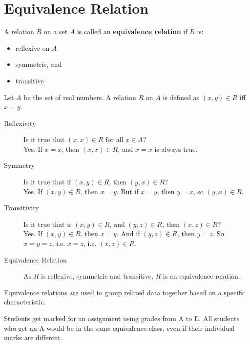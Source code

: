 \documentclass[../notes.tex]{subfiles}
\begin{document}
		\section{Equivalence Relation}
			A relation $R$ on a set $A$ is called an \textbf{equivalence relation} if $R$ is:
			\begin{itemize}[nosep]
				\item reflexive on $A$
				\item symmetric, and
				\item transitive
			\end{itemize}
			\begin{example}
				Let $A$ be the set of real numbers. A relation $R$ on $A$ is defined as $(x, y) \in R$ iff $x = y$.
				\begin{description}
					\item[Reflexivity] Is it true that $(x, x) \in R$ for all $x \in A$?\\
						Yes. If $x = x$, then $(x, x) \in R$, and $x = x$ is always true.
					\item[Symmetry] Is it true that if $(x, y) \in R$, then $(y, x) \in R$?\\
						Yes. If $(x, y) \in R$, then $x = y$. But if $x = y$, then $y = x$, so $(y, x) \in R$.
					\item[Transitivity] Is it true that is $(x, y) \in R$, and $(y, z) \in R$, then $(x, z) \in R$?\\
						Yes. If $(x, y) \in R$, then $x = y$. And if $(y, z) \in R$, then $y = z$. So $x = y = z$, i.e. $x = z$, i.e. $(x, z) \in R$.
					\item[Equivalence Relation] As $R$ is reflexive, symmetric and transitive, $R$ is an equivalence relation.
				\end{description} 
			\end{example}
			Equivalence relations are used to group related data together based on a specific characteristic.
			\begin{example}
				Students get marked for an assignment using grades from A to E. All students who get an A would be in the same equivalence class, even if their individual marks are different.
			\end{example}
\end{document}
